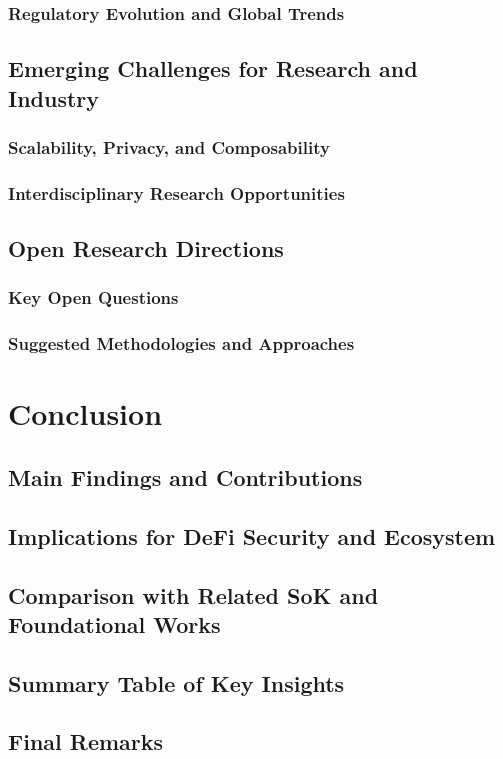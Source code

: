 \documentclass[conference]{IEEEtran}
\begin{document}
    \subsubsection{Regulatory Evolution and Global Trends}
\subsection{Emerging Challenges for Research and Industry}
    \subsubsection{Scalability, Privacy, and Composability}
    \subsubsection{Interdisciplinary Research Opportunities}
\subsection{Open Research Directions}
    \subsubsection{Key Open Questions}
    \subsubsection{Suggested Methodologies and Approaches}

\section{Conclusion}
    \subsection{Main Findings and Contributions}
    \subsection{Implications for DeFi Security and Ecosystem}
    \subsection{Comparison with Related SoK and Foundational Works}
    \subsection{Summary Table of Key Insights}
    \subsection{Final Remarks}








\end{document}
